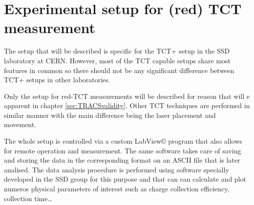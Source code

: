  \section{Experimental setup for (red) TCT measurement} %
 \label{sec:TCTsetup}

The setup that will be described is specific for the TCT+ setup in the SSD laboratory at CERN. However, most of the TCT capable setups share most features in common so there should not be any significant difference between TCT+ setups in other laboratories. 

Only the setup for red-TCT measurements will be described for reason that will e apparent in chapter \ref{sec:TRACSvalidity}. Other TCT techniques are performed in similar manner with the main difference being the laser placement and movement.



The whole setup is controlled via a custom LabView\copyright\cite{labview} program that also allows for remote operation and measurement. The same software takes care of saving and storing the data in the corresponding format on an ASCII file that is later analised. The data analysis procedure is performed using software specially developed in the SSD group for this purpose and that can can calculate and plot numeros physical parameters of interest such as charge collection efficiency, collection time\ldots






 
